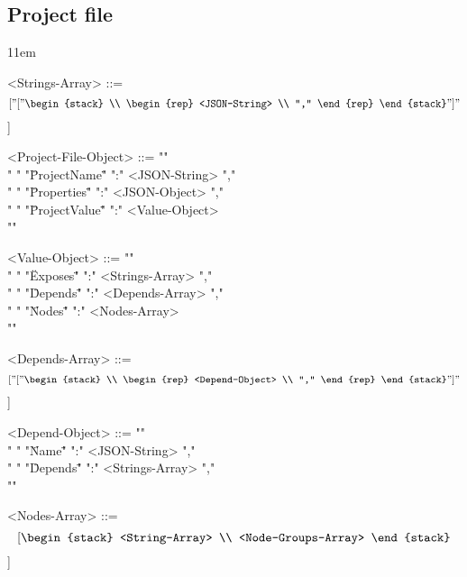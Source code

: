 \subsection{Project file}
\label{sec:protocol-project-file}


\begin{nonfloatingfigure}

\grammarindent11em %
\begin{grammar}

<Strings-Array> ::= \[[
    "["
    \begin{stack}
      \\
      \begin{rep}
        <JSON-String> \\
        ","
      \end{rep}
    \end{stack}
    "]"
    \]]

<Project-File-Object> ::= "{" \\
  "  " "\"ProjectName\"" ":" <JSON-String> "," \\
  "  " "\"Properties\"" ":" <JSON-Object> "," \\
  "  " "\"ProjectValue\"" ":" <Value-Object> \\
  "}"

<Value-Object> ::= "{" \\
  "  " "\"Exposes\"" ":" <Strings-Array> "," \\
  "  " "\"Depends\"" ":" <Depends-Array> "," \\
  "  " "\"Nodes\"" ":" <Nodes-Array> \\
  "}"

<Depends-Array> ::= \[[
    "["
    \begin{stack}
      \\
      \begin{rep}
        <Depend-Object> \\
        ","
      \end{rep}
    \end{stack}
    "]"
    \]]

<Depend-Object> ::= "{" \\
  "  " "\"Name\"" ":" <JSON-String> "," \\
  "  " "\"Depends\"" ":" <Strings-Array> "," \\
  "}"

<Nodes-Array> ::= \[[
    \begin{stack}
      <String-Array> \\
      <Node-Groups-Array>
    \end{stack}
    \]]


\end{grammar}
\end{nonfloatingfigure}
